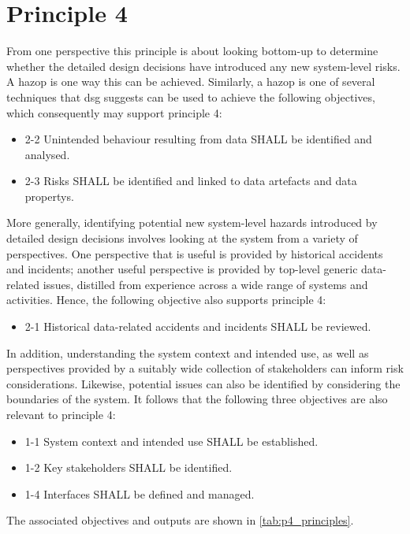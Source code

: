 \cbend

\section{Principle 4}

From one perspective this principle is about looking bottom-up to determine whether the detailed design decisions have introduced any new system-level risks. A \gls{hazop} is one way this can be achieved. Similarly, a \gls{hazop} is one of several techniques that \gls{dsg} suggests can be used to achieve the following objectives, which consequently may support principle 4:

\begin{itemize}
	\item \textcolor{dsiwgAccentColour}{2-2} Unintended behaviour resulting from data SHALL be identified and analysed.
	\item \textcolor{dsiwgAccentColour}{2-3} Risks SHALL be identified and linked to \glspl{data artefact} and \glspl{data property}.
\end{itemize}

More generally, identifying potential new system-level hazards introduced by detailed design decisions involves looking at the system from a variety of perspectives. One perspective that is useful is provided by historical accidents and incidents; another useful perspective is provided by top-level generic data-related issues, distilled from experience across a wide range of systems and activities. Hence, the following objective also supports principle 4:

\begin{itemize}
	\item \textcolor{dsiwgAccentColour}{2-1} Historical data-related accidents and incidents SHALL be reviewed.
\end{itemize}

In addition, understanding the system context and intended use, as well as perspectives provided by a suitably wide collection of \glspl{stakeholder} can inform risk considerations. Likewise, potential issues can also be identified by considering the boundaries of the system. It follows that the following three objectives are also relevant to principle 4:

\begin{itemize}
	\item \textcolor{dsiwgAccentColour}{1-1} System context and intended use SHALL be established.
	\item \textcolor{dsiwgAccentColour}{1-2} Key \glspl{stakeholder} SHALL be identified.
	\item \textcolor{dsiwgAccentColour}{1-4} Interfaces SHALL be defined and managed.
\end{itemize}
\cbstart
The associated objectives and outputs are shown in \ref{tab:p4_principles}.

